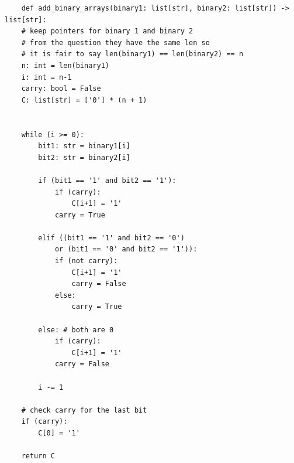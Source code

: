 \begin{verbatim}
    def add_binary_arrays(binary1: list[str], binary2: list[str]) -> list[str]:
    # keep pointers for binary 1 and binary 2
    # from the question they have the same len so 
    # it is fair to say len(binary1) == len(binary2) == n
    n: int = len(binary1)
    i: int = n-1
    carry: bool = False
    C: list[str] = ['0'] * (n + 1)
    
    
    while (i >= 0):
        bit1: str = binary1[i]
        bit2: str = binary2[i]
        
        if (bit1 == '1' and bit2 == '1'):
            if (carry):
                C[i+1] = '1'
            carry = True
            
        elif ((bit1 == '1' and bit2 == '0') 
            or (bit1 == '0' and bit2 == '1')):
            if (not carry):
                C[i+1] = '1'
                carry = False
            else:
                carry = True
                
        else: # both are 0
            if (carry):
                C[i+1] = '1'
            carry = False
            
        i -= 1
    
    # check carry for the last bit
    if (carry):
        C[0] = '1'
    
    return C
\end{verbatim}

